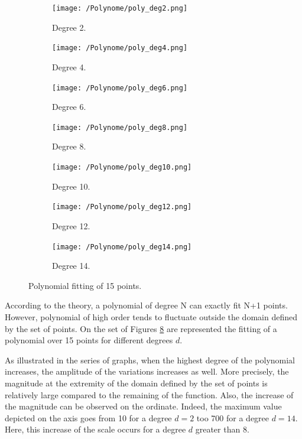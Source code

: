 \begin{figure}[h]
    \centering
    \begin{subfigure}[b]{0.3\textwidth}
        \centering
        \texttt{[image: /Polynome/poly\_deg2.png]}
        \caption{Degree 2.}
        \label{fig:degree 2}
    \end{subfigure}
    \begin{subfigure}[b]{0.3\textwidth}
        \centering
        \texttt{[image: /Polynome/poly\_deg4.png]}
        \caption{Degree 4.}
        \label{fig:degree 4}
    \end{subfigure}
    \begin{subfigure}[b]{0.3\textwidth}
        \centering
        \texttt{[image: /Polynome/poly\_deg6.png]}
        \caption{Degree 6.}
        \label{fig:degree 6}
    \end{subfigure}
    \begin{subfigure}[b]{0.3\textwidth}
        \centering
        \texttt{[image: /Polynome/poly\_deg8.png]}
        \caption{Degree 8.}
        \label{fig:degree 8}
    \end{subfigure}
    \begin{subfigure}[b]{0.3\textwidth}
        \centering
        \texttt{[image: /Polynome/poly\_deg10.png]}
        \caption{Degree 10.}
        \label{fig:degree 10}
    \end{subfigure}
    \begin{subfigure}[b]{0.3\textwidth}
        \centering
        \texttt{[image: /Polynome/poly\_deg12.png]}
        \caption{Degree 12.}
        \label{fig:degree 12}
    \end{subfigure}
    \begin{subfigure}[b]{0.3\textwidth}
        \centering
        \texttt{[image: /Polynome/poly\_deg14.png]}
        \caption{Degree 14.}
        \label{fig:degree 14}
    \end{subfigure}
    \caption{Polynomial fitting of 15 points.} \label{fig:C7_poly}
\end{figure}

According to the theory, a polynomial of degree N can exactly fit N+1 points. However, polynomial of high order tends to fluctuate outside the domain defined by the set of points. On the set of Figures \ref{fig:C7_poly} are represented the fitting of a polynomial over 15 points for different degrees $d$.



As illustrated in the series of graphs, when the highest degree of the polynomial increases, the amplitude of the variations increases as well. More precisely, the magnitude at the extremity of the domain defined by the set of points is relatively large compared to the remaining of the function. Also, the increase of the magnitude can be observed on the ordinate. Indeed, the maximum value depicted on the axis goes from 10 for a degree $d=2$ too 700 for a degree $d=14$. Here, this increase of the scale occurs for a degree $d$ greater than 8.

